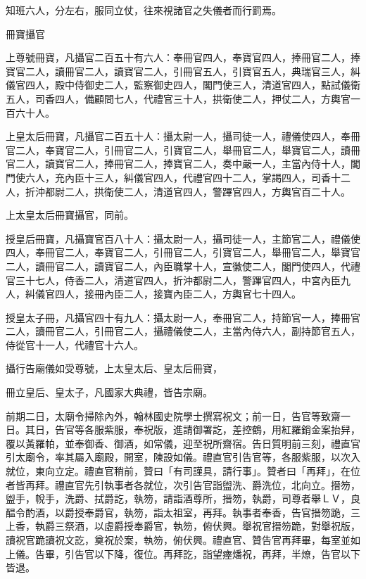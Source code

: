 \begin{pinyinscope}
 知班六人，分左右，服同立仗，往來視諸官之失儀者而行罰焉。



 冊寶攝官



 上尊號冊寶，凡攝官二百五十有六人：奉冊官四人，奉寶官四人，捧冊官二人，捧寶官二人，讀冊官二人，讀寶官二人，引冊官五人，引寶官五人，典瑞官三人，糾儀官四人，殿中侍御史二人，監察御史四人，閣門使三人，清道官四人，點試儀衛五人，司香四人，備顧問七人，代禮官三十人，拱衛使二人，押仗二人，方輿官一百六十人。



 上皇太后冊寶，凡攝官二百五十人：攝太尉一人，攝司徒一人，禮儀使四人，奉冊官二人，奉寶官二人，引冊官二人，引寶官二人，舉冊官二人，舉寶官二人，讀冊官二人，讀寶官二人，捧冊官二人，捧寶官二人，奏中嚴一人，主當內侍十人，閣門使六人，充內臣十三人，糾儀官四人，代禮官四十二人，掌謁四人，司香十二人，折沖都尉二人，拱衛使二人，清道官四人，警蹕官四人，方輿官百二十人。



 上太皇太后冊寶攝官，同前。



 授皇后冊寶，凡攝寶官百八十人：攝太尉一人，攝司徒一人，主節官二人，禮儀使四人，奉冊官二人，奉寶官二人，引冊官二人，引寶官二人，舉冊官二人，舉寶官二人，讀冊官二人，讀寶官二人，內臣職掌十人，宣徽使二人，閣門使四人，代禮官三十七人，侍香二人，清道官四人，折沖都尉二人，警蹕官四人，中宮內臣九人，糾儀官四人，接冊內臣二人，接寶內臣二人，方輿官七十四人。



 授皇太子冊，凡攝官四十有九人：攝太尉一人，奉冊官二人，持節官一人，捧冊官二人，讀冊官二人，引冊官二人，攝禮儀使二人，主當內侍六人，副持節官五人，侍從官十一人，代禮官十六人。



 攝行告廟儀如受尊號，上太皇太后、皇太后冊寶，



 冊立皇后、皇太子，凡國家大典禮，皆告宗廟。



 前期二日，太廟令掃除內外，翰林國史院學士撰寫祝文；前一日，告官等致齋一日。其日，告官等各服紫服，奉祝版，進請御署訖，差控鶴，用紅羅銷金案抬舁，覆以黃羅帕，並奉御香、御酒，如常儀，迎至祝所齋宿。告日質明前三刻，禮直官引太廟令，率其屬入廟殿，開室，陳設如儀。禮直官引告官等，各服紫服，以次入就位，東向立定。禮直官稍前，贊曰「有司謹具，請行事」。贊者曰「再拜」，在位者皆再拜。禮直官先引執事者各就位，次引告官詣盥洗、爵洗位，北向立。搢笏，盥手，帨手，洗爵、拭爵訖，執笏，請詣酒尊所，搢笏，執爵，司尊者舉ＬＶ，良醖令酌酒，以爵授奉爵官，執笏，詣太祖室，再拜。執事者奉香，告官搢笏跪，三上香，執爵三祭酒，以虛爵授奉爵官，執笏，俯伏興。舉祝官搢笏跪，對舉祝版，讀祝官跪讀祝文訖，奠祝於案，執笏，俯伏興。禮直官、贊告官再拜畢，每室並如上儀。告畢，引告官以下降，復位。再拜訖，詣望瘞燔祝，再拜，半燎，告官以下皆退。




\end{pinyinscope}
